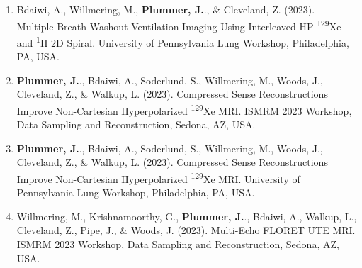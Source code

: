 \documentclass[12pt,]{scrartcl}
\begin{document}
\begin{enumerate}
  \item Bdaiwi, A., Willmering, M., \textbf{Plummer, J.}., \& Cleveland, Z. (2023). Multiple-Breath Washout Ventilation Imaging Using Interleaved HP \textsuperscript{129}Xe and \textsuperscript{1}H 2D Spiral. University of Pennsylvania Lung Workshop, Philadelphia, PA, USA.
  
  \item \textbf{Plummer, J.}., Bdaiwi, A., Soderlund, S., Willmering, M., Woods, J., Cleveland, Z., \& Walkup, L. (2023). Compressed Sense Reconstructions Improve Non-Cartesian Hyperpolarized \textsuperscript{129}Xe MRI. ISMRM 2023 Workshop, Data Sampling and Reconstruction, Sedona, AZ, USA.  
  
  \item \textbf{Plummer, J.}., Bdaiwi, A., Soderlund, S., Willmering, M., Woods, J., Cleveland, Z., \& Walkup, L. (2023). Compressed Sense Reconstructions Improve Non-Cartesian Hyperpolarized \textsuperscript{129}Xe MRI. University of Pennsylvania Lung Workshop, Philadelphia, PA, USA.  
  
  \item Willmering, M., Krishnamoorthy, G., \textbf{Plummer, J.}., Bdaiwi, A., Walkup, L., Cleveland, Z., Pipe, J., \& Woods, J. (2023). Multi-Echo FLORET UTE MRI. ISMRM 2023 Workshop, Data Sampling and Reconstruction, Sedona, AZ, USA.  
  

\end{enumerate}
\end{document}
